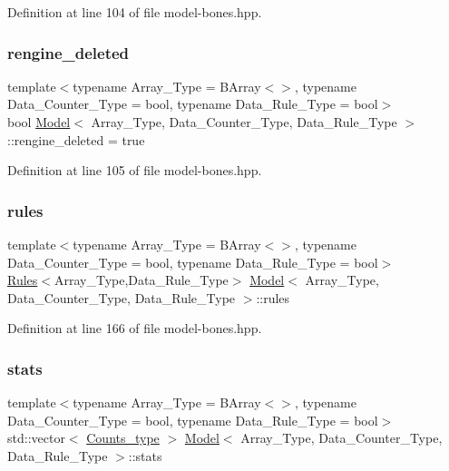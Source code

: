 Definition at line 104 of file model-\/bones.\+hpp.

\mbox{\label{class_model_ab541ac2a0bbac640e2b8cdd745f1a632}} 
\subsubsection{\texorpdfstring{rengine\+\_\+deleted}{rengine\_deleted}}
{\footnotesize\ttfamily template$<$typename Array\+\_\+\+Type = B\+Array$<$$>$, typename Data\+\_\+\+Counter\+\_\+\+Type = bool, typename Data\+\_\+\+Rule\+\_\+\+Type = bool$>$ \\
bool \hyperlink{class_model}{Model}$<$ Array\+\_\+\+Type, Data\+\_\+\+Counter\+\_\+\+Type, Data\+\_\+\+Rule\+\_\+\+Type $>$\+::rengine\+\_\+deleted = true}



Definition at line 105 of file model-\/bones.\+hpp.

\mbox{\label{class_model_a65b96a73f8dba8a00cc767753aaca22b}} 
\subsubsection{\texorpdfstring{rules}{rules}}
{\footnotesize\ttfamily template$<$typename Array\+\_\+\+Type = B\+Array$<$$>$, typename Data\+\_\+\+Counter\+\_\+\+Type = bool, typename Data\+\_\+\+Rule\+\_\+\+Type = bool$>$ \\
\hyperlink{class_rules}{Rules}$<$Array\+\_\+\+Type,Data\+\_\+\+Rule\+\_\+\+Type$>$ \hyperlink{class_model}{Model}$<$ Array\+\_\+\+Type, Data\+\_\+\+Counter\+\_\+\+Type, Data\+\_\+\+Rule\+\_\+\+Type $>$\+::rules}



Definition at line 166 of file model-\/bones.\+hpp.

\mbox{\label{class_model_abd7e36250a681bd2ade69d087e8200e1}} 
\subsubsection{\texorpdfstring{stats}{stats}}
{\footnotesize\ttfamily template$<$typename Array\+\_\+\+Type = B\+Array$<$$>$, typename Data\+\_\+\+Counter\+\_\+\+Type = bool, typename Data\+\_\+\+Rule\+\_\+\+Type = bool$>$ \\
std\+::vector$<$ \hyperlink{typedefs_8hpp_aee40fa17c1fddb63dd1f2b1470ade95b}{Counts\+\_\+type} $>$ \hyperlink{class_model}{Model}$<$ Array\+\_\+\+Type, Data\+\_\+\+Counter\+\_\+\+Type, Data\+\_\+\+Rule\+\_\+\+Type $>$\+::stats}



